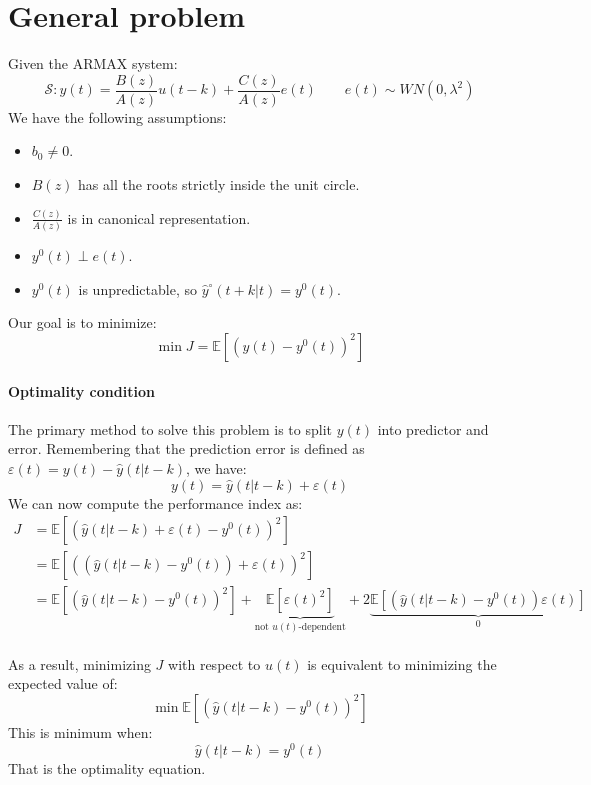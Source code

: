 \section{General problem}

Given the ARMAX system:
\[\mathcal{S}:y(t)=\dfrac{B(z)}{A(z)}u(t-k)+\dfrac{C(z)}{A(z)}e(t) \qquad e(t)\sim WN(0,\lambda^2)\]
We have the following assumptions:
\begin{itemize}
    \item $b_0\neq 0$. 
    \item $B(z)$ has all the roots strictly inside the unit circle.
    \item $\frac{C(z)}{A(z)}$ is in canonical representation. 
    \item $y^{0}(t)\perp e(t)$. 
    \item $y^{0}(t)$ is unpredictable, so $\hat{y}^\circ(t+k|t)=y^{0}(t)$. 
\end{itemize}
Our goal is to minimize:
\[\min{J}=\mathbb{E}\left[\left(y(t)-y^{0}(t)\right)^2\right]\]

\paragraph*{Optimality condition}
The primary method to solve this problem is to split $y(t)$  into predictor and error. 
Remembering that the prediction error is defined as $\varepsilon(t)=y(t)-\hat{y}(t|t-k)$, we have:
\[y(t)=\hat{y}(t|t-k)+\varepsilon(t)\]
We can now compute the performance index as:
\begin{align*}
    J   &=\mathbb{E}\left[\left(\hat{y}(t|t-k)+\varepsilon(t)-y^{0}(t)\right)^2\right] \\
        &=\mathbb{E}\left[\left(\left(\hat{y}(t|t-k)-y^{0}(t)\right)+\varepsilon(t)\right)^2\right] \\
        &=\mathbb{E}\left[\left(\hat{y}(t|t-k)-y^{0}(t)\right)^2\right]+\underbrace{\mathbb{E}\left[\varepsilon(t)^2\right]}_{\text{not }u(t)\text{-dependent}} +2\underbrace{\mathbb{E}\left[\left(\hat{y}(t|t-k)-y^{0}(t)\right)\varepsilon(t)\right]}_0  \\ \\ \\
\end{align*}
As a result, minimizing $J$ with respect to $u(t)$  is equivalent to minimizing the expected value of:
\[\min\mathbb{E}\left[\left(\hat{y}(t|t-k)-y^{0}(t)\right)^2\right]\]
This is minimum when:
\[\hat{y}(t|t-k)=y^{0}(t)\]
That is the optimality equation.

